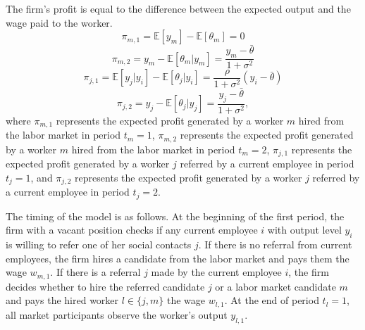 \documentclass[12pt]{article}
\begin{document}

The firm's profit is equal to the difference between the expected output and the wage paid to the worker.
\begin{equation}\label{eq_pi_m_1}
    \pi_{m,1} = \mathbb{E}[y_m]-\mathbb{E}[\theta_m] = 0
\end{equation}
\begin{equation}\label{eq_pi_m_2}
    \pi_{m,2} = y_m - \mathbb{E}[\theta_m|y_m] = \frac{y_m-\bar{\theta}}{1+\sigma^2}
\end{equation}
\begin{equation}\label{eq_pi_j_1}
    \pi_{j,1} = \mathbb{E}[y_j|y_i]-\mathbb{E}[\theta_j|y_i] = \frac{\rho}{1+\sigma^2}(y_i-\bar{\theta})
\end{equation}
\begin{equation}\label{eq_pi_j_2}
    \pi_{j,2} = y_j - \mathbb{E}[\theta_j|y_j] = \frac{y_j-\bar{\theta}}{1+\sigma^2},
\end{equation}
where $\pi_{m,1}$ represents the expected profit generated by a worker $m$ hired from the labor market in period $t_m = 1$, $\pi_{m,2}$ represents the expected profit generated by a worker $m$ hired from the labor market in period $t_m = 2$, $\pi_{j,1}$ represents the expected profit generated by a worker $j$ referred by a current employee in period $t_j = 1$, and $\pi_{j,2}$ represents the expected profit generated by a worker $j$ referred by a current employee in period $t_j = 2$.

The timing of the model is as follows. At the beginning of the first period, the firm with a vacant position checks if any current employee $i$ with output level $y_i$ is willing to refer one of her social contacts $j$. If there is no referral from current employees, the firm hires a candidate from the labor market and pays them the wage $w_{m,1}$. If there is a referral $j$ made by the current employee $i$, the firm decides whether to hire the referred candidate $j$ or a labor market candidate $m$ and pays the hired worker $l \in \lbrace j,m \rbrace$ the wage $w_{l,1}$. At the end of period $t_l = 1$, all market participants observe  the worker's output $y_{l,1}$. %
\end{document}
